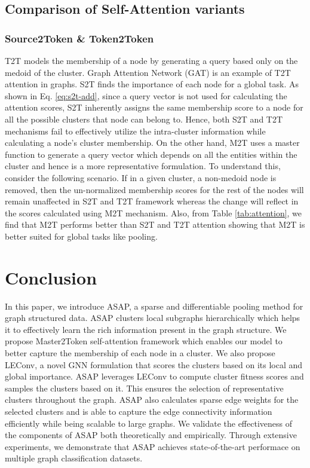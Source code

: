 \documentclass[letterpaper]{article} \usepackage{aaai20}  \usepackage{times}  \usepackage{helvet} \usepackage{courier}  \usepackage[hyphens]{url}  \usepackage{graphicx} \urlstyle{rm} \def\UrlFont{\rm}  \usepackage{graphicx}  \frenchspacing  \setlength{\pdfpagewidth}{8.5in}  \setlength{\pdfpageheight}{11in}
\begin{document}
\subsection{Comparison of Self-Attention variants}
\label{ssec:m2t_compare}
\subsubsection{Source2Token \& Token2Token}
T2T models the membership of a node by generating a query based only on the medoid of the cluster. Graph Attention Network (GAT) \cite{gat} is an example of T2T attention in graphs. S2T finds the importance of each node for a global task. As shown in Eq. \ref{eq:s2t-add}, since a query vector is not used for calculating the attention scores, S2T inherently assigns the same membership score to a node for all the possible clusters that node can belong to. Hence, both S2T and T2T mechanisms fail to effectively utilize the intra-cluster information while calculating a node's cluster membership. On the other hand, M2T uses a master function  to generate a query vector which depends on all the entities within the cluster and hence is a more representative formulation. To understand this, consider the following scenario. If in a given cluster, a non-medoid node is removed, then the un-normalized membership scores for the rest of the nodes will remain unaffected in S2T and T2T framework whereas the change will reflect in the scores calculated using M2T mechanism. Also, from Table \ref{tab:attention}, we find that M2T performs better than S2T and T2T attention showing that M2T is better suited for global tasks like pooling.

%
 
\section{Conclusion}
In this paper, we introduce ASAP, a sparse and differentiable pooling method for graph structured data. ASAP clusters local subgraphs hierarchically which helps it to effectively learn the rich information present in the graph structure. We propose Master2Token self-attention framework which enables our model to better capture the membership of each node in a cluster. We also propose LEConv, a novel GNN formulation that scores the clusters based on its local and global importance. ASAP leverages LEConv to compute cluster fitness scores and samples the clusters based on it. This ensures the selection of representative clusters throughout the graph. ASAP also calculates sparse edge weights for the selected clusters and is able to capture the edge connectivity information efficiently while being scalable to large graphs. We validate the effectiveness of the components of ASAP both theoretically and empirically. Through extensive experiments, we demonstrate that ASAP achieves state-of-the-art performace on multiple graph classification datasets.
\end{document}
